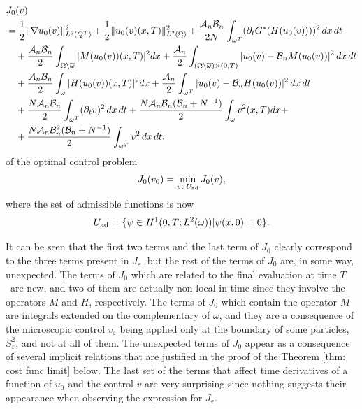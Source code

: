\documentclass[reqno]{amsart}
\begin{document}
\begin{equation}
\begin{aligned}
&J_0(v) \\
&=  \frac{1}{2}\| \nabla u_0(v)\| _{L^2(Q^{T})}^2+\frac{1}{2}\|
u_0(v)(x,T)\| _{L^2(\Omega )}^2 + \frac{\mathcal{A}_n\mathcal{B}_n}{2N}
\int _{\omega ^{T}}(\partial _{t}G^{\ast }(H(u_0(v))))^2 \,dx\,dt
  \\
&\quad +\frac{\mathcal{A}_n\mathcal{B}_n}{2}\int _{\Omega \setminus
\overline{\omega }}|M(u_0(v))(x,T)|^2{dx}+\frac{\mathcal{A}_n}{2}
\int _{(\Omega \setminus \overline{\omega })\times (0,T)}|u_0(v)-\mathcal{B}
_nM(u_0(v))|^2\,dx\,dt    \\
&\quad +\frac{\mathcal{A}_n\mathcal{B}_n}{2}\int _{\omega }|H(u_0(v))(x,T)|^2{%
dx}+\frac{\mathcal{A}_n}{2}\int _{\omega ^{T}}|u_0(v)-\mathcal{B}%
_nH(u_0(v))|^2\,dx\,dt    \\
&\quad +\frac{N\mathcal{A}_n\mathcal{B}_n}{2}\int _{\omega ^{T}}(\partial
_{t}v)^2\,dx\,dt+\frac{N\mathcal{A}_n\mathcal{B}_n(\mathcal{B}_n+N^{-1})}{2}\int _{\omega }v^2(x,T){dx}+    \\
&\quad +\frac{N\mathcal{A}_n\mathcal{B}_n^2(\mathcal{B}_n+N^{-1})}{2}\int _{%
\omega ^{T}}v^2\,dx\,dt.
\end{aligned} \label{limit functional}
\end{equation}
of the optimal control problem
\begin{equation}
J_0(v_0)=\min _{v\in U_{\rm ad}}J_0(v),
\end{equation}
where the set of admissible functions is now
\[
U_{\rm ad}=\{ \psi \in H^{1}(0,T;L^2(\omega ))|\psi (x,0)=0\}.
\]

It can be seen that the first two terms and the last term of $J_0$ clearly
correspond to the three terms present in $J_{\varepsilon }$, but the rest of
the terms of $J_0$ are, in some way, unexpected. The terms of $J_0$
which are related to the final evaluation at time $T$ \ are new, and two of
them are actually non-local in time since they involve the operators $M$ and
$H$, respectively. The terms of $J_0$ which contain the operator $M$ are
integrals extended on the complementary of $\omega $, and they are a
consequence of the microscopic control $v_{\varepsilon }$ being applied only
at the boundary of some particles, $S_{\varepsilon }^2$, and not at all of
them. The unexpected terms of $J_0$ appear as a consequence of several
implicit relations that are justified in the proof of the Theorem 
\ref{thm: cost func limit} below. The last set of the terms that affect time
derivatives of a function of $u_0$ and the control $v$ are very surprising
since nothing suggests their appearance when observing the expression for 
$J_{\varepsilon }$.
\end{document}
